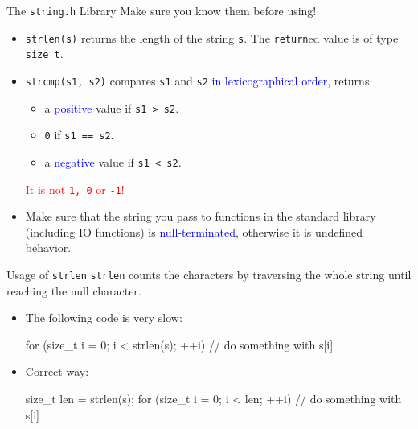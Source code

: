 \documentclass{beamer}
\newcommand{\red}[1]{\textcolor{red}{#1}}
\newcommand{\blue}[1]{\textcolor{blue}{#1}}
\newcommand{\ttt}[1]{\texttt{#1}}
\theoremstyle{definition}
\begin{document}
\begin{frame}{The \ttt{string.h} Library}
    Make sure you know them before using!
    \begin{itemize}
        \item \ttt{strlen(s)} returns the length of the string \ttt{s}. The \ttt{return}ed value is of type \ttt{size\_t}.
        \pause
        \item \ttt{strcmp(s1, s2)} compares \ttt{s1} and \ttt{s2} \blue{in lexicographical order}, returns
        \begin{itemize}
            \item a \blue{positive} value if \ttt{s1 > s2}.
            \item \ttt{0} if \ttt{s1 == s2}.
            \item a \blue{negative} value if \ttt{s1 < s2}.
        \end{itemize}
        \red{It is not \ttt{1, 0} or \ttt{-1}!}
        \pause
        \item Make sure that the string you pass to functions in the standard library (including IO functions) is \blue{null-terminated}, otherwise it is undefined behavior.
    \end{itemize}
\end{frame}

\begin{frame}[fragile]{Usage of \ttt{strlen}}
    \ttt{strlen} counts the characters by traversing the whole string until reaching the null character.
    \begin{itemize}
        \item The following code is very slow:
        \begin{cpp}
for (size_t i = 0; i < strlen(s); ++i)
  // do something with s[i]
        \end{cpp}
        \pause
        \item Correct way:
        \begin{cpp}
size_t len = strlen(s);
for (size_t i = 0; i < len; ++i)
  // do something with s[i]
        \end{cpp}
    \end{itemize}
\end{frame}
\end{document}
